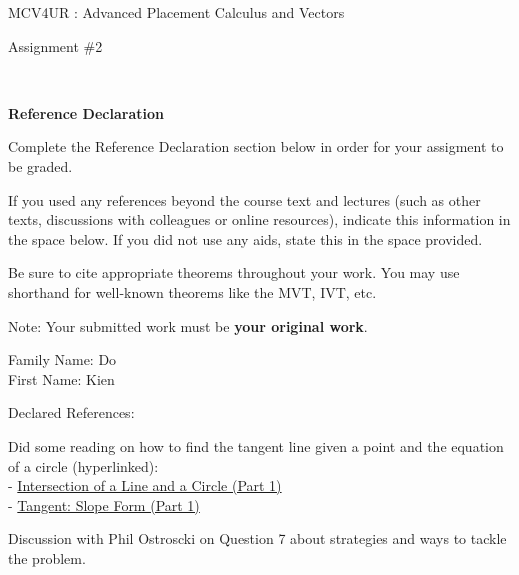 \documentclass[12pt]{book}
\begin{document}
\vspace{-1.0in}\begin{center}
\Large{MCV4UR : Advanced Placement Calculus and Vectors }

\Large{Assignment \#2}


\end{center}


\vspace{0.015in}\hrulefill\ 

\textbf{Reference Declaration} %

Complete the Reference Declaration section below in order for your assigment to be graded.

If you used any references beyond the course text and lectures (such as other texts, discussions with colleagues or online resources), indicate this information in the space below.  If you did not use any aids, state this in the space provided. 

Be sure to cite appropriate theorems throughout your work. You may use shorthand for well-known theorems like the MVT, IVT, etc. 

Note: Your submitted work must be \textbf{your original work}. 

Family Name: Do\\%
First Name: Kien%

Declared References:

Did some reading on how to find the tangent line given a point and the equation of a circle (hyperlinked):\\
- \href{https://doubleroot.in/lessons/circle/intersection-line-circle-1/}{Intersection of a Line and a Circle (Part 1)} \\
- \href{https://doubleroot.in/lessons/circle/tangent-slope-form-1/}{Tangent: Slope Form (Part 1)} 

Discussion with Phil Ostroscki on Question 7 about strategies and ways to tackle the problem.


\vspace{0.015in}\hrulefill\ 

\newpage

\end{document}
